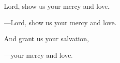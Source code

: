 \responsory

\begin{hangpar}


\medskip Lord, show us your mercy and love.

{\color{red}---\thinspace }Lord, show us your mercy and love.

\medskip And grant us your salvation,

{\color{red}---\thinspace }your mercy and love.
\end{hangpar}